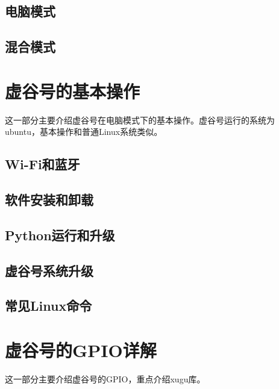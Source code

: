 \documentclass[letterpaper,10pt,english]{sphinxmanual}
\begin{document}
\section{电脑模式}
\label{\detokenize{02.quick/2.3-pc::doc}}\label{\detokenize{02.quick/2.3-pc:id1}}

\section{混合模式}
\label{\detokenize{02.quick/2.4-blend::doc}}\label{\detokenize{02.quick/2.4-blend:id1}}

\chapter{虚谷号的基本操作}
\label{\detokenize{03.basic/index::doc}}\label{\detokenize{03.basic/index:id1}}
这一部分主要介绍虚谷号在电脑模式下的基本操作。虚谷号运行的系统为ubuntu，基本操作和普通Linux系统类似。


\section{Wi-Fi和蓝牙}
\label{\detokenize{03.basic/3.1::doc}}\label{\detokenize{03.basic/3.1:wi-fi}}

\section{软件安装和卸载}
\label{\detokenize{03.basic/3.2::doc}}\label{\detokenize{03.basic/3.2:id1}}

\section{Python运行和升级}
\label{\detokenize{03.basic/3.3::doc}}\label{\detokenize{03.basic/3.3:python}}

\section{虚谷号系统升级}
\label{\detokenize{03.basic/3.4::doc}}\label{\detokenize{03.basic/3.4:id1}}

\section{常见Linux命令}
\label{\detokenize{03.basic/3.5::doc}}\label{\detokenize{03.basic/3.5:linux}}

\chapter{虚谷号的GPIO详解}
\label{\detokenize{04.gpio/index::doc}}\label{\detokenize{04.gpio/index:gpio}}
这一部分主要介绍虚谷号的GPIO，重点介绍xugu库。
\end{document}
